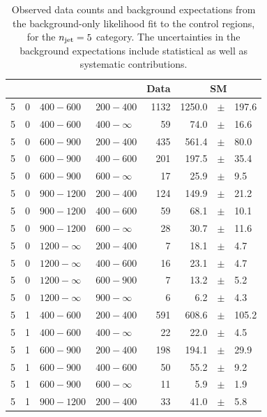 \clearpage
\begin{table}[!h]
	\caption{
		Observed data counts and background expectations from the 
		background-only likelihood fit to the control regions, for the 
		$n_{\text{jet}}=5$ category. The uncertainties in the background expectations 
		include statistical as well as systematic contributions. 
	}
	\label{tab:cronly_sr_result-eq5j}
	\scriptsize
	\centering
	\begin{tabular}{rrllrrcl}
		\hline
		\njet\T\B & \nb & \scalht [GeV] & \mht [GeV] & Data & 
		\multicolumn{3}{c}{SM} \\ 
		\hline
		5\T & 0 & $ 400- 600$ & $200-400$ &   1132 &   1250.0 &$\pm$&  197.6 \\
		5 & 0 & $ 400- 600$ & $400-\infty$ &     59 &     74.0 &$\pm$&   16.6 \\
		5\T & 0 & $ 600- 900$ & $200-400$ &    435 &    561.4 &$\pm$&   80.0 \\
		5 & 0 & $ 600- 900$ & $400-600$ &    201 &    197.5 &$\pm$&   35.4 \\
		5 & 0 & $ 600- 900$ & $600-\infty$ &     17 &     25.9 &$\pm$&    9.5 \\
		5\T & 0 & $ 900-1200$ & $200-400$ &    124 &    149.9 &$\pm$&   21.2 \\
		5 & 0 & $ 900-1200$ & $400-600$ &     59 &     68.1 &$\pm$&   10.1 \\
		5 & 0 & $ 900-1200$ & $600-\infty$ &     28 &     30.7 &$\pm$&   11.6 \\
		5\T & 0 & $1200- \infty$ & $200-400$ &      7 &     18.1 &$\pm$&    4.7 
		\\
		5 & 0 & $1200- \infty$ & $400-600$ &     16 &     23.1 &$\pm$&    4.7 \\
		5 & 0 & $1200- \infty$ & $600-900$ &      7 &     13.2 &$\pm$&    5.2 \\
		5 & 0 & $1200- \infty$ & $900-\infty$ &      6 &      6.2 &$\pm$&    
		4.3 \\
		5\T & 1 & $ 400- 600$ & $200-400$ &    591 &    608.6 &$\pm$&  105.2 \\
		5 & 1 & $ 400- 600$ & $400-\infty$ &     22 &     22.0 &$\pm$&    4.5 \\
		5\T & 1 & $ 600- 900$ & $200-400$ &    198 &    194.1 &$\pm$&   29.9 \\
		5 & 1 & $ 600- 900$ & $400-600$ &     50 &     55.2 &$\pm$&    9.2 \\
		5 & 1 & $ 600- 900$ & $600-\infty$ &     11 &      5.9 &$\pm$&    1.9 \\
		5\T & 1 & $ 900-1200$ & $200-400$ &     33 &     41.0 &$\pm$&    5.8 \\

\end{tabular}
\end{table}
